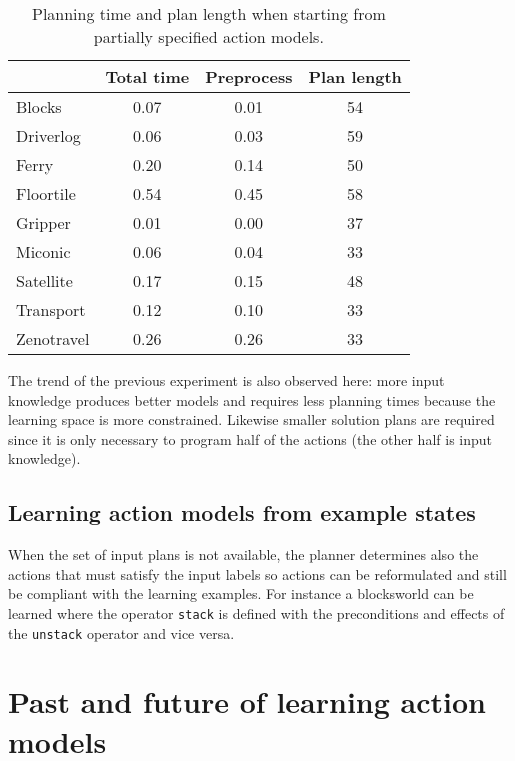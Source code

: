 \documentclass[letterpaper]{article} %
\begin{document}
\begin{table}[hbt!]
\begin{footnotesize}
	\begin{center}
		\begin{tabular}{l|c|c|c|}			
			 & Total time & Preprocess & Plan length  \\
			\hline
			Blocks & 0.07 & 0.01 & 54  \\
			Driverlog & 0.06 & 0.03 & 59 \\
			Ferry & 0.20 & 0.14 & 50 \\
			Floortile & 0.54 & 0.45 & 58 \\
			Gripper & 0.01 & 0.00 & 37 \\
			Miconic & 0.06 & 0.04 & 33  \\
			Satellite & 0.17 & 0.15 & 48 \\
			Transport & 0.12 & 0.10 & 33 \\
			Zenotravel & 0.26 & 0.26 & 33
		\end{tabular}
	\end{center}
        \end{footnotesize}
	\caption{\small Planning time and plan length when starting from partially specified action models.}
	\label{tab:time_plans_partial}	
\end{table}

The trend of the previous experiment is also observed here: more input knowledge produces better models and requires less planning times because the learning space is more constrained. Likewise smaller solution plans are required since it is only necessary to program half of the actions (the other half is input knowledge).   


\subsection{Learning action models from example states}
When the set of input plans is not available, the planner determines also the actions that must satisfy the input labels so actions can be reformulated and still be compliant with the learning examples. For instance a blocksworld can be learned where the operator {\small\tt stack} is defined with the preconditions and effects of the {\small\tt unstack} operator and vice versa.



\section{Past and future of learning action models}
\end{document}
